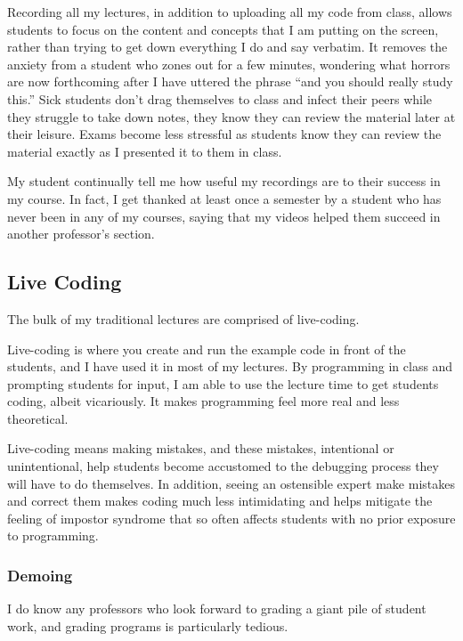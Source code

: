 \documentclass[10pt]{article}
\begin{document}
Recording all my lectures, in addition to uploading all my code from class, allows students to focus on the content and concepts that I am putting on the screen, rather than trying to get down everything I do and say verbatim.
It removes the anxiety from a student who zones out for a few minutes, wondering what horrors are now forthcoming after I have uttered the phrase ``and you should really study this.''
Sick students don't drag themselves to class and infect their peers while they struggle to take down notes, they know they can review the material later at their leisure.
Exams become less stressful as students know they can review the material exactly as I presented it to them in class.

My student continually tell me how useful my recordings are to their success in my course.  In fact, I get thanked at least once a semester by a student who has never been in any of my courses, saying that my videos helped them succeed in another professor's section.




\subsection{Live Coding}
The bulk of my traditional lectures are comprised of live-coding.

Live-coding is where you create and run the example code in front of the students, and I have used it in most of my lectures.
By programming in class and prompting students for input, I am able to use the lecture time to get students coding, albeit vicariously.
It makes programming feel more real and less theoretical.

Live-coding means making mistakes, and these mistakes, intentional or unintentional, help students become accustomed to the debugging process they will have to do themselves.
In addition, seeing an ostensible expert make mistakes and correct them makes coding much less intimidating and helps mitigate the feeling of impostor syndrome that so often affects students with no prior exposure to programming.
\subsubsection{Demoing}
I do know any professors who look forward to grading a giant pile of student work, and grading programs is particularly tedious. 
\end{document}
